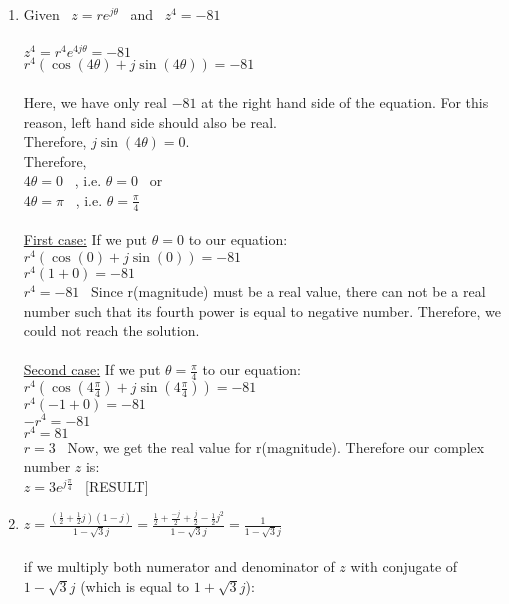 \documentclass[10pt,a4paper, margin=1in]{article}
\begin{document}
\begin{enumerate}
\begin{enumerate}
    \item %
    Given \ $z = re^{j\theta}$ \ and \ $z^4 = -81$ \\
    \\
    $z^4 = r^4 e^{4j\theta} = -81$ \\
    $r^4 (\cos(4\theta) + j\sin(4\theta)) = -81$ \\
    \\
    Here, we have only real $-81$ at the right hand side of the equation. For this reason, left hand side should also be real. \\
     Therefore, $j\sin(4\theta) = 0$. \\
     Therefore, \\
      $4\theta = 0$ \ , i.e. $\theta = 0$  \ or \\
       $4\theta = \pi$ \ , i.e. $\theta = \frac{\pi}{4}$\\
       \\
      \underline{First case:} If we put $\theta = 0$ to our equation: \\
      $r^4 (\cos(0) + j\sin(0)) = -81$ \\
      $r^4(1+0) = -81$ \\
      $r^4 = -81$ \ Since r(magnitude) must be a real value, there can not be a real number such that its fourth power is equal to negative number. Therefore, we could not reach the solution. \\
      \\
       \underline{Second case:} If we put $\theta = \frac{\pi}{4}$ to our equation: \\
      $r^4 (\cos(4\frac{\pi}{4}) + j\sin(4\frac{\pi}{4})) = -81$ \\
      $r^4(-1+0) = -81$ \\
      $-r^4 = -81$ \\
      $r^4 = 81$ \\
      $r = 3$ \ Now, we get the real value for r(magnitude). Therefore our complex number $z$ is: \\
      $z = 3e^{j\frac{\pi}{4}}$ \ [RESULT]
    \item %
    $z = \frac{(\frac{1}{2} + \frac{1}{2}j)(1-j)}{1- \sqrt{3}j} = \frac{\frac{1}{2} + \frac{-j}{2} + \frac{j}{2} - \frac{1}{2}j^2}{1- \sqrt{3}j} = \frac{1}{1- \sqrt{3}j}$ \\
    \\
    if we multiply both numerator and denominator of $z$ with conjugate of $1- \sqrt{3}j$ (which is equal to $1 + \sqrt{3}j$): \\

\end{enumerate}
\end{enumerate}
\end{document}
